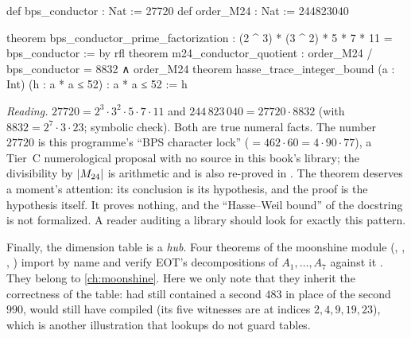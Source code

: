 \begin{leanbox}
\begin{leancode}
def bps_conductor : Nat := 27720
def order_M24 : Nat := 244823040

theorem bps_conductor_prime_factorization :
    (2 ^ 3) * (3 ^ 2) * 5 * 7 * 11 = bps_conductor := by rfl
theorem m24_conductor_quotient :
    order_M24 / bps_conductor = 8832 ∧ order_M24 %
theorem hasse_trace_integer_bound (a : Int) (h : a * a ≤ 52) :
    a * a ≤ 52 := h
\end{leancode}
\emph{Reading.} $27720=2^3\cdot3^2\cdot5\cdot7\cdot11$ and $244\,823\,040=27720\cdot8832$
(with $8832=2^7\cdot3\cdot23$; symbolic check). Both are true numeral facts. The number
$27720$ is this programme's ``BPS character lock'' ($=462\cdot60=4\cdot90\cdot77$), a
Tier~C numerological proposal with no source in this book's library; the divisibility by
$|M_{24}|$ is arithmetic and is also re-proved in
. The theorem
 deserves a moment's attention: its conclusion is its
hypothesis, and the proof is the hypothesis itself. It proves nothing, and the ``Hasse--Weil
bound'' of the docstring is not formalized. A reader auditing a library should look for
exactly this pattern.
\end{leanbox}

\begin{sloppypar}
Finally, the dimension table is a \emph{hub}. Four theorems of the moonshine module
 (,
, , ) import
 by name and verify EOT's decompositions of $A_1,\dots,A_7$ against it
. They belong to \cref{ch:moonshine}. Here we only
note that they inherit the correctness of the table: had  still contained
a second $483$ in place of the second $990$,  would still
have compiled (its five witnesses are at indices $2,4,9,19,23$), which is another
illustration that lookups do not guard tables.
\end{sloppypar}

